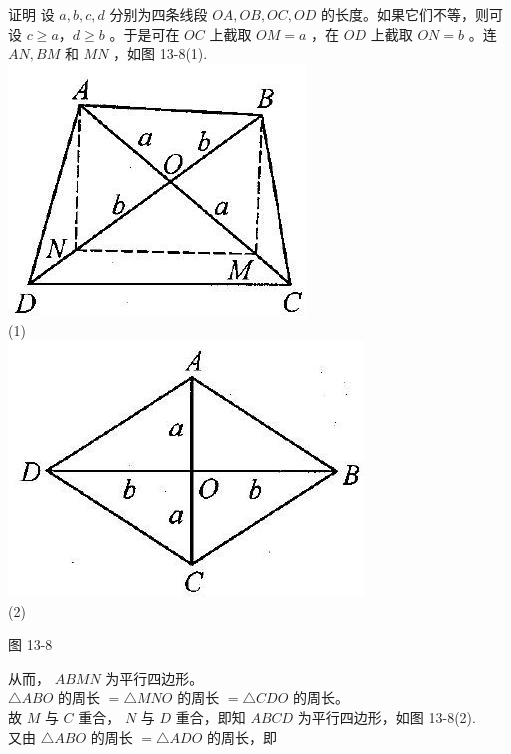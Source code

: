 \documentclass[10pt]{article}
\begin{document}
证明 设 $a, b, c, d$ 分别为四条线段 $O A, O B, O C, O D$ 的长度。如果它们不等，则可设 $c \geqslant a ， d \geqslant b$ 。于是可在 $O C$ 上截取 $O M=a$ ，在 $O D$ 上截取 $O N=b$ 。连 $A N, B M$ 和 $M N$ ，如图 13-8(1).\\
\includegraphics[max width=\textwidth, center]{2024_10_30_2c8f45efd4a519b08e1ag-124(2)}\\
(1)\\
\includegraphics[max width=\textwidth, center]{2024_10_30_2c8f45efd4a519b08e1ag-124(1)}\\
(2)

图 13-8

从而， $A B M N$ 为平行四边形。\\
$\triangle A B O$ 的周长 $=\triangle M N O$ 的周长 $=\triangle C D O$ 的周长。\\
故 $M$ 与 $C$ 重合， $N$ 与 $D$ 重合，即知 $A B C D$ 为平行四边形，如图 13-8(2).\\
又由 $\triangle A B O$ 的周长 $=\triangle A D O$ 的周长，即
\end{document}

